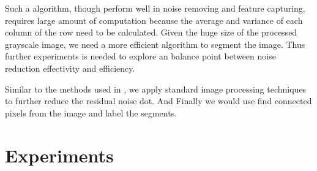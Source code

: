 \documentclass{article} %
\begin{document}
Such a algorithm, though perform well in noise removing and feature capturing, requires large amount of computation because the average and variance of each column of the row need to be calculated. Given the huge size of the processed grayscale image, we need a more efficient algorithm to segment the image. Thus further experiments is needed to explore an balance point between noise reduction effectivity and efficiency.

Similar to the methods used in \cite{Lasseck13}, we apply standard image processing techniques to further reduce the residual noise dot. And Finally we would use find connected pixels from the image and label the segments.
\section{Experiments}





\end{document}
